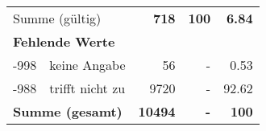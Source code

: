 \begin{longtable}{lXrrr}
     \midrule
     \multicolumn{2}{l}{Summe (gültig)} &
       \textbf{\num{718}} &
     \textbf{\num{100}} &
       \textbf{\num[round-mode=places,round-precision=2]{6.84}} \\
     \multicolumn{5}{l}{\textbf{Fehlende Werte}}\\
       -998 &
       keine Angabe &
         \num{56} &
        - &
         \num[round-mode=places,round-precision=2]{0.53} \\
       -988 &
       trifft nicht zu &
         \num{9720} &
        - &
         \num[round-mode=places,round-precision=2]{92.62} \\
     \midrule
     \multicolumn{2}{l}{\textbf{Summe (gesamt)}} &
          \textbf{\num{10494}} &
        \textbf{-} &
        \textbf{\num{100}} \\
     \bottomrule
     \end{longtable}
     
